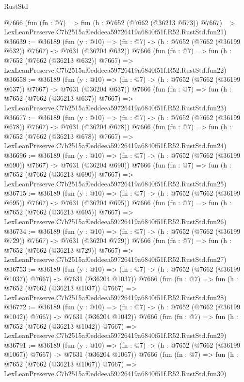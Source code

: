 \begin{lexlean}{RustStd}
\begin{coremodule}
    @7666
    (fun (fn : @7) =>
    fun (h : @7652 (@7662 (@36213 @573)) @7667) =>
    LexLeanPreserve.C7b2515af0eddeea59726419a6840f51f.R52.RustStd.fun21)
@36639 := @36189
    (fun (y : @10) => (fn : @7) -> (h : @7652 (@7662 (@36199 @632)) @7667) -> @7631 (@36204 @632))
    @7666
    (fun (fn : @7) =>
    fun (h : @7652 (@7662 (@36213 @632)) @7667) =>
    LexLeanPreserve.C7b2515af0eddeea59726419a6840f51f.R52.RustStd.fun22)
@36658 := @36189
    (fun (y : @10) => (fn : @7) -> (h : @7652 (@7662 (@36199 @637)) @7667) -> @7631 (@36204 @637))
    @7666
    (fun (fn : @7) =>
    fun (h : @7652 (@7662 (@36213 @637)) @7667) =>
    LexLeanPreserve.C7b2515af0eddeea59726419a6840f51f.R52.RustStd.fun23)
@36677 := @36189
    (fun (y : @10) => (fn : @7) -> (h : @7652 (@7662 (@36199 @678)) @7667) -> @7631 (@36204 @678))
    @7666
    (fun (fn : @7) =>
    fun (h : @7652 (@7662 (@36213 @678)) @7667) =>
    LexLeanPreserve.C7b2515af0eddeea59726419a6840f51f.R52.RustStd.fun24)
@36696 := @36189
    (fun (y : @10) => (fn : @7) -> (h : @7652 (@7662 (@36199 @690)) @7667) -> @7631 (@36204 @690))
    @7666
    (fun (fn : @7) =>
    fun (h : @7652 (@7662 (@36213 @690)) @7667) =>
    LexLeanPreserve.C7b2515af0eddeea59726419a6840f51f.R52.RustStd.fun25)
@36715 := @36189
    (fun (y : @10) => (fn : @7) -> (h : @7652 (@7662 (@36199 @695)) @7667) -> @7631 (@36204 @695))
    @7666
    (fun (fn : @7) =>
    fun (h : @7652 (@7662 (@36213 @695)) @7667) =>
    LexLeanPreserve.C7b2515af0eddeea59726419a6840f51f.R52.RustStd.fun26)
@36734 := @36189
    (fun (y : @10) => (fn : @7) -> (h : @7652 (@7662 (@36199 @729)) @7667) -> @7631 (@36204 @729))
    @7666
    (fun (fn : @7) =>
    fun (h : @7652 (@7662 (@36213 @729)) @7667) =>
    LexLeanPreserve.C7b2515af0eddeea59726419a6840f51f.R52.RustStd.fun27)
@36753 := @36189
    (fun (y : @10) => (fn : @7) -> (h : @7652 (@7662 (@36199 @1037)) @7667) -> @7631 (@36204 @1037))
    @7666
    (fun (fn : @7) =>
    fun (h : @7652 (@7662 (@36213 @1037)) @7667) =>
    LexLeanPreserve.C7b2515af0eddeea59726419a6840f51f.R52.RustStd.fun28)
@36772 := @36189
    (fun (y : @10) => (fn : @7) -> (h : @7652 (@7662 (@36199 @1042)) @7667) -> @7631 (@36204 @1042))
    @7666
    (fun (fn : @7) =>
    fun (h : @7652 (@7662 (@36213 @1042)) @7667) =>
    LexLeanPreserve.C7b2515af0eddeea59726419a6840f51f.R52.RustStd.fun29)
@36791 := @36189
    (fun (y : @10) => (fn : @7) -> (h : @7652 (@7662 (@36199 @1067)) @7667) -> @7631 (@36204 @1067))
    @7666
    (fun (fn : @7) =>
    fun (h : @7652 (@7662 (@36213 @1067)) @7667) =>
    LexLeanPreserve.C7b2515af0eddeea59726419a6840f51f.R52.RustStd.fun30)

\end{coremodule}
\end{lexlean}
